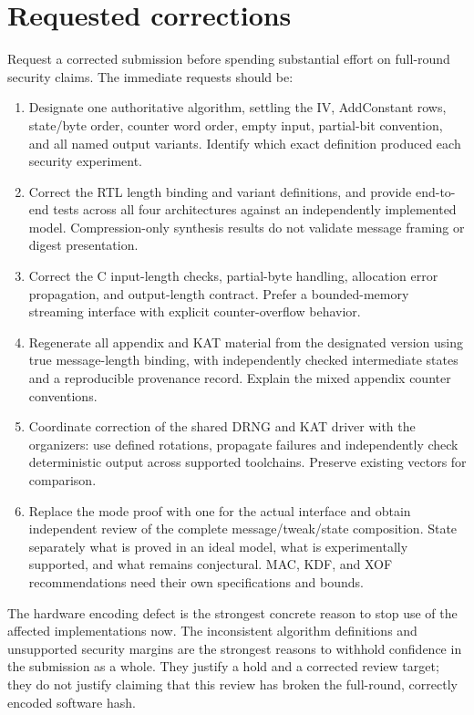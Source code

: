 \documentclass[
  english,
  11pt,
  a4paper,
]{article}
\providecommand{\tightlist}{%
  \setlength{\itemsep}{0pt}\setlength{\parskip}{0pt}}
\begin{document}

\section{Requested corrections}\label{requested-corrections}

Request a corrected submission before spending substantial effort on
full-round security claims. The immediate requests should be:

\begin{enumerate}
\def\labelenumi{\arabic{enumi}.}
\tightlist
\item
  Designate one authoritative algorithm, settling the IV, AddConstant
  rows, state/byte order, counter word order, empty input, partial-bit
  convention, and all named output variants. Identify which exact
  definition produced each security experiment.
\item
  Correct the RTL length binding and variant definitions, and provide
  end-to-end tests across all four architectures against an
  independently implemented model. Compression-only synthesis results do
  not validate message framing or digest presentation.
\item
  Correct the C input-length checks, partial-byte handling, allocation
  error propagation, and output-length contract. Prefer a bounded-memory
  streaming interface with explicit counter-overflow behavior.
\item
  Regenerate all appendix and KAT material from the designated version
  using true message-length binding, with independently checked
  intermediate states and a reproducible provenance record. Explain the
  mixed appendix counter conventions.
\item
  Coordinate correction of the shared DRNG and KAT driver with the
  organizers: use defined rotations, propagate failures and
  independently check deterministic output across supported toolchains.
  Preserve existing vectors for comparison.
\item
  Replace the mode proof with one for the actual interface and obtain
  independent review of the complete message/tweak/state composition.
  State separately what is proved in an ideal model, what is
  experimentally supported, and what remains conjectural. MAC, KDF, and
  XOF recommendations need their own specifications and bounds.
\end{enumerate}

The hardware encoding defect is the strongest concrete reason to stop
use of the affected implementations now. The inconsistent algorithm
definitions and unsupported security margins are the strongest reasons
to withhold confidence in the submission as a whole. They justify a hold
and a corrected review target; they do not justify claiming that this
review has broken the full-round, correctly encoded software hash.
\end{document}
